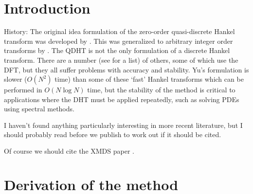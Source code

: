 \documentclass[aip,amsmath,amssymb,reprint,onecolumn]{revtex4-1}
\begin{document}
\section{Introduction}
\label{sec:Introduction}

History: The original idea formulation of the zero-order quasi-discrete Hankel transform was developed by \citet{Yu:1998}.  This was generalized to arbitrary integer order transforms by \citet{Guizar-Sicairos:2004}.  The QDHT is not the only formulation of a discrete Hankel transform.  There are a number (see \citep{Yu:1998} for a list) of others, some of which use the DFT, but they all suffer problems with accuracy and stability.  Yu's formulation is slower ($O(N^2)$ time) than some of these `fast' Hankel transforms which can be performed in $O(N \log N)$ time, but the stability of the method is critical to applications where the DHT must be applied repeatedly, such as solving PDEs using spectral methods.

I haven't found anything particularly interesting in more recent literature, but I should probably read \citet{Cerjan:2007} before we publish to work out if it should be cited.

Of course we should cite the XMDS paper \citet{Dennis:2013}.

\section{Derivation of the method}
\label{sec:Derivation}




\end{document}
